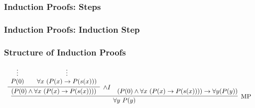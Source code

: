 \documentclass{beamer}
\theoremstyle{indentDefn} \newtheorem{defn}[]{Definition}
\begin{document}
\begin{frame}
	\frametitle{Induction Proofs: Steps}


\end{frame}

\begin{frame}
	\frametitle{Induction Proofs: Induction Step}



\end{frame}

\begin{frame}
	\frametitle{Structure of Induction Proofs}

	\begin{scriptsize}
			$\begin{array}{c}
				\infer[\MP]{\forall y \ P(y)}
					{\infer[\land I]{(P(0) \land \forall x \ (P(x) \to P(s(x))))}
						{\begin{array}{c} \vdots \\ P(0) \end{array}
						&
						\begin{array}{c} \vdots \\ \forall x \ (P(x) \to P(s(x))) \end{array}}
					&
					(P(0) \land \forall x \ (P(x) \to P(s(x)))) \rightarrow \forall y (P(y))}
			\end{array}$
	\end{scriptsize}

\end{frame}
\end{document}
